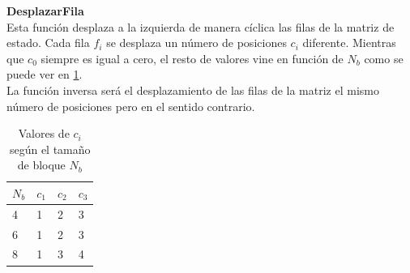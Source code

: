 \begin{description}
	\item \textbf{DesplazarFila}\\
		Esta función desplaza a la izquierda de manera cíclica las filas de la matriz de estado. Cada fila $f_i$ se desplaza un número de posiciones $c_i$ diferente. Mientras que $c_0$ siempre es igual a cero, el resto de valores vine en función de $N_b$ como se puede ver en \ref{ciennb}.\\
		La función inversa será el desplazamiento de las filas de la matriz el mismo número de posiciones pero en el sentido contrario.

		\begin{table}[htb]
			\begin{center}
				\begin{tabular}{| l | l | l | l |}
						\hline
						$N_b$ & $c_1$ & $c_2$ & $c_3$\\ \hline
						4 & 1 & 2 & 3\\ \hline 
						6 & 1 & 2 & 3\\ \hline 
						8 & 1 & 3 & 4\\ \hline 
				\end{tabular}
				\caption{Valores de $c_i$ según el tamaño de bloque $N_b$}
				\label{ciennb}
			\end{center}
		\end{table}


\end{description}

